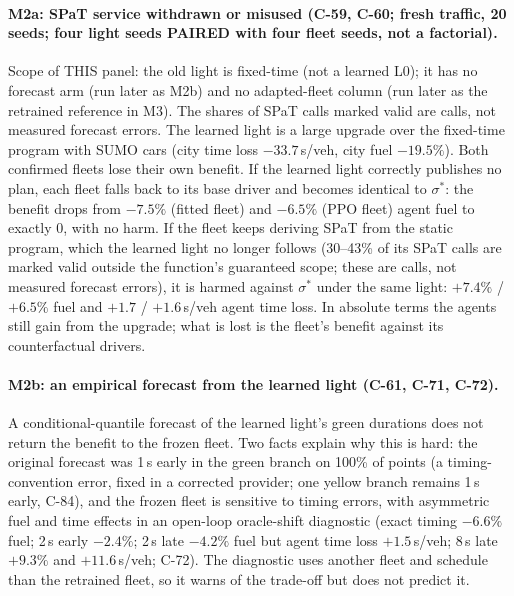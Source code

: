 \documentclass[11pt]{article}
\begin{document}
\paragraph{M2a: SPaT service withdrawn or misused (C-59, C-60; fresh traffic, 20 seeds; four light seeds PAIRED with four fleet
seeds, not a factorial).} Scope of THIS panel: the old light is fixed-time (not a learned L0); it has no forecast arm (run later as M2b)
and no adapted-fleet column (run later as the retrained reference in M3). The shares of SPaT calls marked valid are calls, not measured forecast errors. The learned light is a large
upgrade over the fixed-time program with SUMO cars (city time loss $-33.7$\,s/veh, city fuel $-19.5\%$). Both confirmed fleets lose their
own benefit. If the learned light correctly publishes no plan, each fleet falls back to its base driver and becomes identical to
$\sigma^*$: the benefit drops from $-7.5\%$ (fitted fleet) and $-6.5\%$ (PPO fleet) agent fuel to exactly 0, with no harm. If the fleet
keeps deriving SPaT from the static program, which the learned light no longer follows (30--43\% of its SPaT calls are marked valid
outside the function's guaranteed scope; these are calls, not measured forecast errors), it is harmed against $\sigma^*$ under the same light: $+7.4\%$ / $+6.5\%$ fuel and $+1.7$ / $+1.6$\,s/veh agent time loss. In
absolute terms the agents still gain from the upgrade; what is lost is the fleet's benefit against its counterfactual drivers.
\paragraph{M2b: an empirical forecast from the learned light (C-61, C-71, C-72).} A conditional-quantile forecast of the learned light's
green durations does not return the benefit to the frozen fleet. Two facts explain why this is hard: the original forecast was 1\,s early in
the green branch on 100\% of points (a timing-convention error, fixed in a corrected provider; one yellow branch remains 1\,s early, C-84),
and the frozen fleet is sensitive to timing errors, with asymmetric fuel and time effects in an open-loop oracle-shift diagnostic (exact
timing $-6.6\%$ fuel; 2\,s early $-2.4\%$; 2\,s late $-4.2\%$ fuel but agent time loss $+1.5$\,s/veh; 8\,s late $+9.3\%$ and $+11.6$\,s/veh;
C-72). The diagnostic uses another fleet and schedule than the retrained fleet, so it warns of the trade-off but does not predict it.
\end{document}
